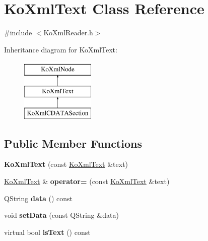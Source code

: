 \hypertarget{classKoXmlText}{
\section{KoXmlText Class Reference}
\label{classKoXmlText}
}


{\ttfamily \#include $<$KoXmlReader.h$>$}

Inheritance diagram for KoXmlText:\begin{figure}[H]
\begin{center}
\leavevmode
\includegraphics[height=3cm]{classKoXmlText}
\end{center}
\end{figure}
\subsection*{Public Member Functions}
\begin{DoxyCompactItemize}
\item 
\hypertarget{classKoXmlText_a527977cf8218598fc9744b55d8918dcb}{
{\bfseries KoXmlText} (const \hyperlink{classKoXmlText}{KoXmlText} \&text)}
\label{classKoXmlText_a527977cf8218598fc9744b55d8918dcb}

\item 
\hypertarget{classKoXmlText_abd7ee0d827d614bd5a387cdef944fc68}{
\hyperlink{classKoXmlText}{KoXmlText} \& {\bfseries operator=} (const \hyperlink{classKoXmlText}{KoXmlText} \&text)}
\label{classKoXmlText_abd7ee0d827d614bd5a387cdef944fc68}

\item 
\hypertarget{classKoXmlText_ab5ee4186e97c97fa2bbf54dc9ffc074f}{
QString {\bfseries data} () const }
\label{classKoXmlText_ab5ee4186e97c97fa2bbf54dc9ffc074f}

\item 
\hypertarget{classKoXmlText_a2e3b8ce0b903e43caf233d2b93ebd733}{
void {\bfseries setData} (const QString \&data)}
\label{classKoXmlText_a2e3b8ce0b903e43caf233d2b93ebd733}

\item 
\hypertarget{classKoXmlText_a910aeb556cd3a9bac84baf81899f3490}{
virtual bool {\bfseries isText} () const }
\label{classKoXmlText_a910aeb556cd3a9bac84baf81899f3490}

\end{DoxyCompactItemize}

